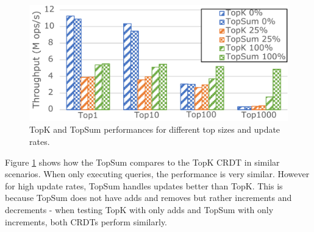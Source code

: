 \documentclass[sigplan,10pt]{acmart}
\newcommand{\andre}[1]{\nbnote{Andre}{blue}{#1}}
\begin{document}

\begin{figure}
	\centering
	\includegraphics[width=.7\linewidth]{TopKVSTopSum_cut}
	\caption{TopK and TopSum performances for different top sizes and update rates.}
	\label{fig:TopkVSTopsum}
\end{figure}

Figure \ref{fig:TopkVSTopsum} shows how the TopSum compares to the TopK CRDT in similar scenarios.
When only executing queries, the performance is very similar. 
However for high update rates, TopSum handles updates better than TopK.
This is because TopSum does not have adds and removes but rather increments and decrements - when testing TopK with only adds and TopSum with only increments, both CRDTs perform similarly.
\end{document}
